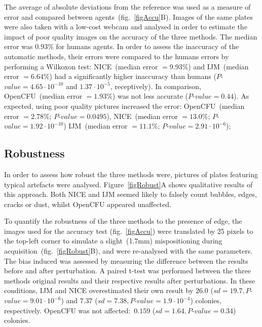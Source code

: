 \documentclass[10pt]{article}
\newcommand{\IJM}{IJM}
\newcommand{\EdgeNoiseOCFU}{$0.159$ ($sd=1.64, P$-$value=0.34$)}
\newcommand{\EdgeNoiseIJM}{$26.0$ ($sd=19.7, P$-$value=9.01\cdot 10^{-6}$)}
\newcommand{\EdgeNoiseNICE}{$7.37$ ($sd=7.38,P$-$value=1.9\cdot 10^{-4}$)}
\begin{document}
The average of absolute deviations from the reference was used
as a measure of error and compared between agents~(fig.~\ref{figAccu}B).
Images of the same plates were also taken with a low-cost webcam and analysed in
order to estimate the impact of poor quality images on the accuracy of the three
methods.
The median error was $0.93\%$ for humans agents. In order to assess the
inaccuracy of the automatic methods, their errors were compared to the humans
errors by performing a Wilkoxon test:
NICE~(median error $= 9.93\%$) and \IJM{}~(median error $= 6.64\%$) had a significantly higher inaccuracy than
humans ($P$-$value = 4.65\cdot 10^{-10}$ and $1.37\cdot 10^{-5}$, receptively).
In comparison, OpenCFU~(median error $= 1.93\%$) was not less accurate ($P$-$value = 0.44$).
As expected, using poor quality pictures increased the error: OpenCFU~(median error $= 2.78\%$; $P$-$value =
0.0495$), NICE~(median error $= 13.0\%$; $P$-$value = 1.92 \cdot 10^{-10}$) \IJM{}~(median error $= 11.1\%$; $P$-$value = 2.91 \cdot 10^{-6} $);

\subsection*{Robustness} 
In order to assess how robust the three methods were,
pictures of plates featuring typical artefacts were analysed.
Figure~\ref{figRobust}A shows qualitative results of this approach.
Both NICE and \IJM{} seemed likely to falsely count bubbles, edges, cracks or
dust, whilst OpenCFU appeared unaffected.

To quantify the robustness of the three methods to the presence of edge, the
images used for the accuracy test (fig.~\ref{figAccu}) were translated by 25 pixels to the top-left
corner to simulate a slight~(1.7mm) mispositioning during
acquisition~(fig.~\ref{figRobust}B), and were re-analysed with the same
parameters.
The bias induced was assessed by measuring the difference between the results
before and after perturbation. A paired t-test was performed between the three
methods original results and their respective results after perturbations.
In these conditions, \IJM{} and NICE overestimated their own result by
\EdgeNoiseIJM{} and \EdgeNoiseNICE{} colonies, respectively. OpenCFU was not affected:~\EdgeNoiseOCFU{} colonies.
\end{document}
